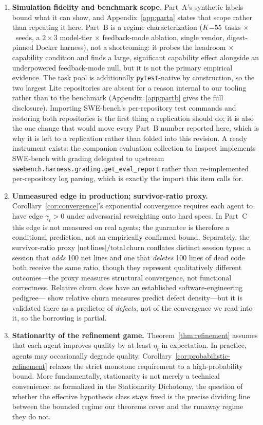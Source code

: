 \begin{enumerate}[leftmargin=*,itemsep=2pt]
    \item \textbf{Simulation fidelity and benchmark scope.} Part~A's synthetic labels bound what it can show, and Appendix~\ref{app:parta} states that scope rather than repeating it here. Part~B is a regime characterization ($K{=}55$ tasks $\times$ \statPBSeeds\ seeds, a $2\times3$ model-tier $\times$ feedback-mode ablation, single vendor, digest-pinned Docker harness), not a shortcoming: it probes the headroom $\times$ capability condition and finds a large, significant capability effect alongside an underpowered feedback-mode null, but it is not the primary empirical evidence. The task pool is additionally \texttt{pytest}-native by construction, so the two largest Lite repositories are absent for a reason internal to our tooling rather than to the benchmark (Appendix~\ref{app:partb} gives the full disclosure). Importing SWE-bench's per-repository test commands and restoring both repositories is the first thing a replication should do; it is also the one change that would move every Part~B number reported here, which is why it is left to a replication rather than folded into this revision. A ready instrument exists: the companion evaluation collection to Inspect \citep{aisi2024inspect} implements SWE-bench with grading delegated to upstream \texttt{swebench.harness.grading.get\_eval\_report} rather than re-implemented per-repository log parsing, which is exactly the import this item calls for.
    \item \textbf{Unmeasured edge in production; survivor-ratio proxy.} Corollary~\ref{cor:convergence}'s exponential convergence requires each agent to have edge $\gamma_t > 0$ under adversarial reweighting onto hard specs. In Part~C this edge is not measured on real agents; the guarantee is therefore a conditional prediction, not an empirically confirmed bound. Separately, the survivor-ratio proxy $|\mathrm{net\,lines}|/\mathrm{total\,churn}$ conflates distinct session types: a session that \emph{adds} 100 net lines and one that \emph{deletes} 100 lines of dead code both receive the same ratio, though they represent qualitatively different outcomes---the proxy measures structural convergence, not functional correctness. Relative churn does have an established software-engineering pedigree---\citet{nagappan2005churn} show relative churn measures predict defect density---but it is validated there as a predictor of \emph{defects}, not of the convergence we read into it, so the borrowing is partial.
    \item \textbf{Stationarity of the refinement game.} Theorem~\ref{thm:refinement} assumes that each agent improves quality by at least $\eta_t$ in expectation. In practice, agents may occasionally degrade quality. Corollary~\ref{cor:probabilistic-refinement} relaxes the strict monotone requirement to a high-probability bound. More fundamentally, stationarity is not merely a technical convenience: as formalized in the Stationarity Dichotomy, the question of whether the effective hypothesis class stays fixed is the precise dividing line between the bounded regime our theorems cover and the runaway regime they do not.

\end{enumerate}
